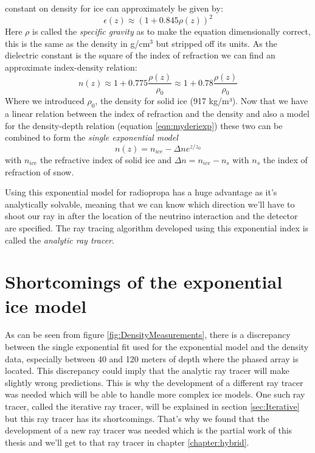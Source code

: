 constant on density for ice can approximately be given by\cite{Robin}:
\begin{equation} 
	\epsilon(z) \approx (1 + 0.845\rho(z))^2 
\end{equation} 
Here $\rho$ is called the \textit{specific gravity} as to make the equation
dimensionally correct, this is the same as the density in g/cm$^3$ but stripped
off its units.  As the dielectric constant is the square of the index of
refraction we can find an approximate index-density relation:
\begin{equation} 
	n(z) \approx 1 + 0.775\frac{\rho(z)}{\rho_0} \approx 1 + 0.78\frac{\rho(z)}{\rho_0} \label{eqn:Schytt}
\end{equation} 
Where we introduced $\rho_0$, the density for solid ice (917 kg/m³).  
Now that we have a linear relation between the index of refraction and the density
and also a model for the density-depth relation (equation \ref{eqn:myderiexp}) these two can
be combined to form the \textit{single exponential model}
\begin{equation}
	\label{eqn:expn}
	n(z) = n_{ice} - \Delta n e^{z/z_0}
\end{equation}
with $n_{ice}$ the refractive index of solid ice and $\Delta n = n_{ice} - n_s$
with $n_s$ the index of refraction of snow. 

Using this exponential model for radiopropa has a huge advantage as it's
analytically solvable, meaning that we can know which direction we'll have to
shoot our ray in after the location of the neutrino interaction and the
detector are specified. The ray tracing algorithm developed using this
exponential index is called the \textit{analytic ray tracer}.

\section{Shortcomings of the exponential ice model}
As can be seen from figure \ref{fig:DensityMeasurements}, there is a
discrepancy between the single exponential fit used for the exponential model
and the density data, especially between 40 and 120 meters of depth where the
phased array is located.  This discrepancy could imply that the analytic ray tracer will
make slightly wrong predictions.  This is why the development of a different
ray tracer was needed which will be able to handle more complex ice models. One
such ray tracer, called the iterative ray tracer, will be explained in section \ref{sec:Iterative} but this ray
tracer has its shortcomings. That's why we found that the development of a new ray tracer
was needed which is the partial work of this thesis and we'll get to that ray
tracer in chapter \ref{chapter:hybrid}.

